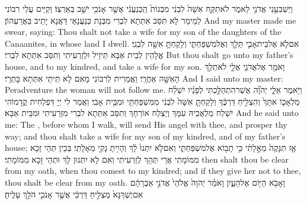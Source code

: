 {וַיַּשְׁבִּעֵ֥נִי אֲדֹנִ֖י לֵאמֹ֑ר לֹא\maqqaf תִקַּ֤ח אִשָּׁה֙ לִבְנִ֔י מִבְּנוֹת֙ הַֽכְּנַעֲנִ֔י אֲשֶׁ֥ר אָנֹכִ֖י יֹשֵׁ֥ב בְּאַרְצֽוֹ׃}
{וְקַיֵּים עֲלַי רִבּוֹנִי לְמֵימַר לָא תִּסַּב אִתְּתָא לִבְרִי מִבְּנָת כְּנַעֲנָאֵי דַּאֲנָא יָתֵיב בַּאֲרַעְהוֹן׃}
{And my master made me swear, saying: Thou shalt not take a wife for my son of the daughters of the Canaanites, in whose land I dwell.}{}
{אִם\maqqaf לֹ֧א אֶל\maqqaf בֵּית\maqqaf אָבִ֛י תֵּלֵ֖ךְ וְאֶל\maqqaf מִשְׁפַּחְתִּ֑י וְלָקַחְתָּ֥ אִשָּׁ֖ה לִבְנִֽי׃}
{אֱלָהֵין לְבֵית אַבָּא תֵּיזֵיל וּלְזַרְעִיתִי וְתִסַּב אִתְּתָא לִבְרִי׃}
{But thou shalt go unto my father’s house, and to my kindred, and take a wife for my son.}{}
{וָאֹמַ֖ר אֶל\maqqaf אֲדֹנִ֑י אֻלַ֛י לֹא\maqqaf תֵלֵ֥ךְ הָאִשָּׁ֖ה אַחֲרָֽי׃}
{וַאֲמַרִית לְרִבּוֹנִי מָאִם לָא תֵּיתֵי אִתְּתָא בָּתְרָי׃}
{And I said unto my master: Peradventure the woman will not follow me.}{}
{וַיֹּ֖אמֶר אֵלָ֑י יְהֹוָ֞ה אֲשֶׁר\maqqaf הִתְהַלַּ֣כְתִּי לְפָנָ֗יו יִשְׁלַ֨ח מַלְאָכ֤וֹ אִתָּךְ֙ וְהִצְלִ֣יחַ דַּרְכֶּ֔ךָ וְלָקַחְתָּ֤ אִשָּׁה֙ לִבְנִ֔י מִמִּשְׁפַּחְתִּ֖י וּמִבֵּ֥ית אָבִֽי׃}
{וַאֲמַר לִי יְיָ דִּפְלַחִית קֳדָמוֹהִי יִשְׁלַח מַלְאֲכֵיהּ עִמָּךְ וְיַצְלַח אוֹרְחָךְ וְתִסַּב אִתְּתָא לִבְרִי מִזַּרְעִיתִי וּמִבֵּית אַבָּא׃}
{And he said unto me: The \lord, before whom I walk, will send His angel with thee, and prosper thy way; and thou shalt take a wife for my son of my kindred, and of my father’s house;}{}
{אָ֤ז תִּנָּקֶה֙ מֵאָ֣לָתִ֔י כִּ֥י תָב֖וֹא אֶל\maqqaf מִשְׁפַּחְתִּ֑י וְאִם\maqqaf לֹ֤א יִתְּנוּ֙ לָ֔ךְ וְהָיִ֥יתָ נָקִ֖י מֵאָלָתִֽי׃}
{בְּכֵין תְּהֵי זָכָא מִמּוֹמָתִי אֲרֵי תְּהָךְ לְזַרְעִיתִי וְאִם לָא יִתְּנוּן לָךְ וּתְהֵי זָכָא מִמּוֹמָתִי׃}
{then shalt thou be clear from my oath, when thou comest to my kindred; and if they give her not to thee, thou shalt be clear from my oath.}{}
\newseder
{}%
{וָאָבֹ֥א הַיּ֖וֹם אֶל\maqqaf הָעָ֑יִן וָאֹמַ֗ר יְהֹוָה֙ אֱלֹהֵי֙ אֲדֹנִ֣י אַבְרָהָ֔ם אִם\maqqaf יֶשְׁךָ\maqqaf נָּא֙ מַצְלִ֣יחַ דַּרְכִּ֔י אֲשֶׁ֥ר אָנֹכִ֖י הֹלֵ֥ךְ עָלֶֽיהָ׃}
